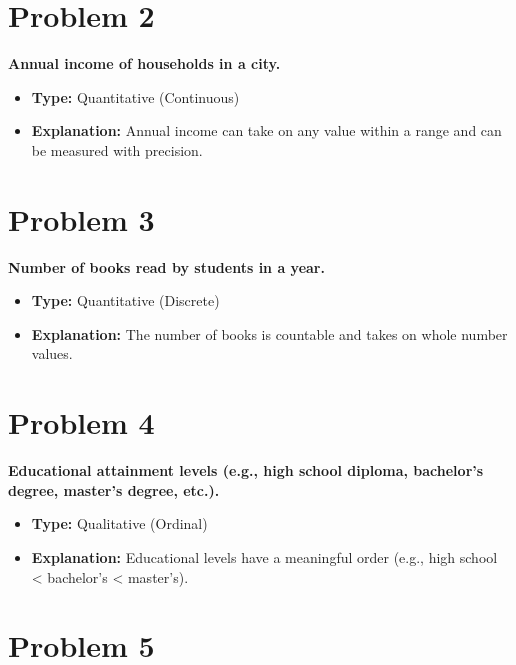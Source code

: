 \documentclass[
  letterpaper,
  DIV=11,
  numbers=noendperiod]{scrreprt}
\begin{document}
\section*{Problem 2}\label{problem-2-2}


\textbf{Annual income of households in a city.}

\begin{itemize}
\item
  \textbf{Type:} Quantitative (Continuous)
\item
  \textbf{Explanation:} Annual income can take on any value within a
  range and can be measured with precision.
\end{itemize}

\section*{Problem 3}\label{problem-3-2}


\textbf{Number of books read by students in a year.}

\begin{itemize}
\item
  \textbf{Type:} Quantitative (Discrete)
\item
  \textbf{Explanation:} The number of books is countable and takes on
  whole number values.
\end{itemize}

\section*{Problem 4}\label{problem-4-2}


\textbf{Educational attainment levels (e.g., high school diploma,
bachelor's degree, master's degree, etc.).}

\begin{itemize}
\item
  \textbf{Type:} Qualitative (Ordinal)
\item
  \textbf{Explanation:} Educational levels have a meaningful order
  (e.g., high school \textless{} bachelor's \textless{} master's).
\end{itemize}

\section*{Problem 5}\label{problem-5-2}
\end{document}
